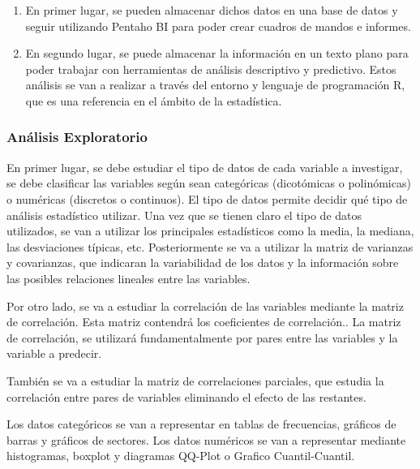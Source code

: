 \begin{enumerate}
\item  En primer lugar, se pueden almacenar dichos datos en una base de datos y seguir utilizando Pentaho BI para poder crear cuadros de mandos e informes. 
\item  En segundo lugar, se puede almacenar la información en un texto plano para poder trabajar con herramientas de análisis descriptivo y predictivo. Estos análisis se van a realizar a través del entorno y lenguaje de programación R, que es una referencia en el ámbito de la estadística.
\end{enumerate}


\subsubsection{Análisis Exploratorio}


En primer lugar, se debe estudiar el tipo de datos de cada variable a investigar, se debe clasificar las variables según sean categóricas (dicotómicas o polinómicas) o numéricas (discretos o continuos). El tipo de datos permite decidir qué tipo de análisis estadístico utilizar.
Una vez que se tienen claro el tipo de datos utilizados, se van a utilizar los principales estadísticos como la media, la mediana, las desviaciones típicas, etc.
Posteriormente se va a utilizar la matriz de varianzas y covarianzas, que indicaran la variabilidad de los datos y la información sobre las posibles relaciones lineales entre las variables. 

Por otro lado, se va a estudiar la correlación de las variables mediante la matriz de correlación. Esta matriz contendrá los coeficientes de correlación.\cite{JMMarin}. La matriz de correlación, se utilizará fundamentalmente por pares entre las variables y la variable a predecir.

También se va a estudiar la matriz de correlaciones parciales, que estudia la correlación entre pares de variables eliminando el efecto de las restantes.\cite{JMMarin}

Los datos categóricos se van a representar en tablas de frecuencias, gráficos de barras y gráficos de sectores. Los datos numéricos se van a representar mediante histogramas, boxplot y diagramas QQ-Plot o Grafico Cuantil-Cuantil. \cite{Orellana2001}

